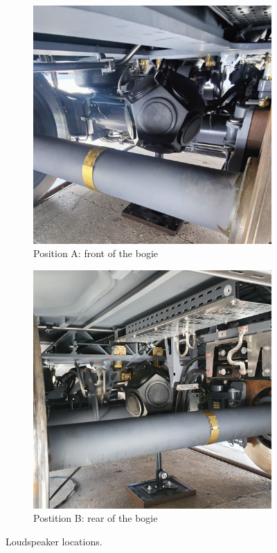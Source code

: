 \begin{figure}[H]
     \centering
     \begin{subfigure}[b]{0.4\textwidth}
         \centering
         \includegraphics[width=\linewidth]{fig/loudspeaker_position_A.jpg}
         \caption{Position A: front of the bogie}
     \end{subfigure}
     \hspace{0.1\textwidth}
     \begin{subfigure}[b]{0.4\textwidth}
         \centering
         \includegraphics[width=\linewidth]{fig/loudspeaker_position_B.jpg}
         \caption{Postition B: rear of the bogie}
     \end{subfigure}
     \caption{Loudspeaker locations.}
     \label{fig:loudspeakerposition}
\end{figure}

